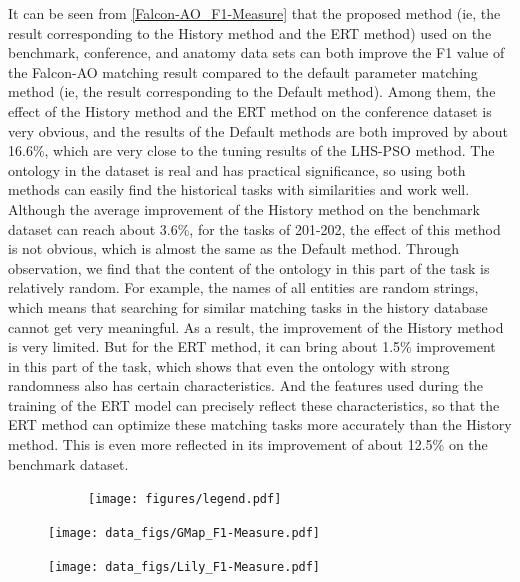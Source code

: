 \documentclass[twoside]{article}
\begin{document}
It can be seen from \ref{Falcon-AO_F1-Measure} that the proposed method (ie, the result corresponding to the History method and the ERT method) used on the benchmark, conference, and anatomy data sets can both improve the F1 value of the Falcon-AO matching result compared to the default parameter matching method (ie, the result corresponding to the Default method).
Among them, the effect of the History method and the ERT method on the conference dataset is very obvious, and the results of the Default methods are both improved by about 16.6\%, which are very close to the tuning results of the LHS-PSO method. The ontology in the dataset is real and has practical significance, so using both methods can easily find the historical tasks with similarities and work well.
Although the average improvement of the History method on the benchmark dataset can reach about 3.6\%, for the tasks of 201-202, the effect of this method is not obvious, which is almost the same as the Default method.
Through observation, we find that the content of the ontology in this part of the task is relatively random. For example, the names of all entities are random strings, which means that searching for similar matching tasks in the history database cannot get very meaningful. As a result, the improvement of the History method is very limited.
But for the ERT method, it can bring about 1.5\% improvement in this part of the task, which shows that even the ontology with strong randomness also has certain characteristics. And the features used during the training of the ERT model can precisely reflect these characteristics, so that the ERT method can optimize these matching tasks more accurately than the History method.
This is even more reflected in its improvement of about 12.5\% on the benchmark dataset.


\begin{figure}[htb!]\centering
\begin{subfigure}{\textwidth}
	\centering
	\texttt{[image: figures/legend.pdf]}
\end{subfigure}
\begin{minipage}{0.49\textwidth}
	\centering
	\texttt{[image: data\_figs/GMap\_F1-Measure.pdf]}
	\label{fig:GMap_F1-Measure}
\end{minipage}
\begin{minipage}{0.49\textwidth}
	\centering
	\texttt{[image: data\_figs/Lily\_F1-Measure.pdf]}
	\label{fig:Lily_F1-Measure}
\end{minipage}
\end{figure}
\end{document}
